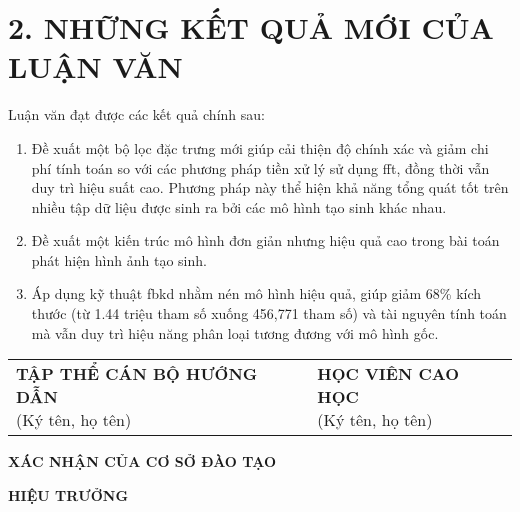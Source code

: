 \section*{2. NHỮNG KẾT QUẢ MỚI CỦA LUẬN VĂN}
Luận văn đạt được các kết quả chính sau:

\begin{enumerate}
	\item Đề xuất một bộ lọc đặc trưng mới giúp cải thiện độ chính xác và giảm chi phí tính toán so với các phương pháp tiền xử lý sử dụng \gls{fft}, đồng thời vẫn duy trì hiệu suất cao. Phương pháp này thể hiện khả năng tổng quát tốt trên nhiều tập dữ liệu được sinh ra bởi các mô hình tạo sinh khác nhau.


	\item Đề xuất một kiến trúc mô hình đơn giản nhưng hiệu quả cao trong bài toán phát hiện hình ảnh tạo sinh.
	
	\item Áp dụng kỹ thuật \gls{fbkd} nhằm nén mô hình hiệu quả, giúp giảm 68\% kích thước (từ 1.44 triệu tham số xuống 456,771 tham số) và tài nguyên tính toán mà vẫn duy trì hiệu năng phân loại tương đương với mô hình gốc.
	
\end{enumerate}

\vspace{4\baselineskip}
\begin{table}[h]
	\begin{adjustbox}{max width =\textwidth}
		\begin{tabular}{p{8.44cm}p{8.4cm}}
			\multicolumn{1}{p{8.44cm}}{
				\centering \textbf{TẬP THỂ CÁN BỘ HƯỚNG DẪN} \newline
				\centering
				(Ký tên, họ tên) \newline
			} &
			\multicolumn{1}{p{8.4cm}}{
				\centering \textbf{HỌC VIÊN CAO HỌC} \newline
				\centering
				(Ký tên, họ tên) \newline
			} \\
		\end{tabular}
	\end{adjustbox}
\end{table}
\vspace{2\baselineskip}
\begin{center}
	\textbf{XÁC NHẬN CỦA CƠ SỞ ĐÀO TẠO}
\end{center}
\begin{center}
	\textbf{HIỆU TRƯỞNG}
\end{center}

